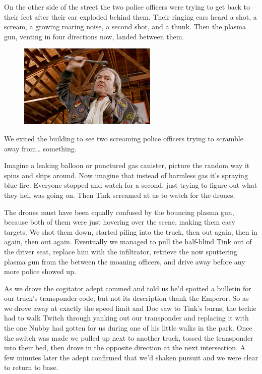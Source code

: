 On the other side of the street the two police officers were trying to get back to their feet after their car exploded behind them. 
Their ringing ears heard a shot, a scream, a growing roaring noise, a second shot, and a thunk. 
Then the plasma gun, venting in four directions now, landed between them. 


\begin{figure}
	\begin{center}
		\includegraphics[width=\figwidth]{pics/10/29.png}
	\end{center}
\end{figure}
We exited the building to see two screaming police officers trying to scramble away from… something.

Imagine a leaking balloon or punctured gas canister, picture the random way it spins and skips around. 
Now imagine that instead of harmless gas it's spraying blue fire. 
Everyone stopped and watch for a second, just trying to figure out what they hell was going on. 
Then Tink screamed at us to watch for the drones.

The drones must have been equally confused by the bouncing plasma gun, because both of them were just hovering over the scene, making them easy targets. 
We shot them down, started piling into the truck, then out again, then in again, then out again. 
Eventually we managed to pull the half-blind Tink out of the driver seat, replace him with the infiltrator, retrieve the now sputtering plasma gun from the between the moaning officers, and drive away before any more police showed up.

As we drove the cogitator adept commed and told us he'd spotted a bulletin for our truck's transponder code, but not its description thank the Emperor. 
So as we drove away at exactly the speed limit and Doc saw to Tink's burns, the techie had to walk Twitch through yanking out our transponder and replacing it with the one Nubby had gotten for us during one of his little walks in the park. 
Once the switch was made we pulled up next to another truck, tossed the transponder into their bed, then drove in the opposite direction at the next intersection. 
A few minutes later the adept confirmed that we'd shaken pursuit and we were clear to return to base.

